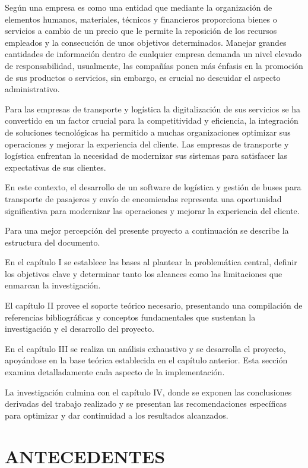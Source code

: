 	Según \textcite{casanueva2000practicas} una empresa es como una entidad que mediante la organización de elementos humanos, materiales, técnicos y financieros proporciona bienes o servicios a cambio de un precio que le permite la reposición de los recursos empleados y la consecución de unos objetivos determinados. Manejar grandes cantidades de información dentro de cualquier empresa demanda un nivel elevado de responsabilidad, usualmente, las compañías ponen más énfasis en la promoción de sus productos o servicios, sin embargo, es crucial no descuidar el aspecto administrativo.
	
	Para las empresas de transporte y logística la digitalización de sus servicios se ha convertido en un factor crucial para la competitividad y eficiencia, la integración de soluciones tecnológicas ha permitido a muchas organizaciones optimizar sus operaciones y mejorar la experiencia del cliente. Las empresas de transporte y logística enfrentan la necesidad de modernizar sus sistemas para satisfacer las expectativas de sus clientes. 
	
	En este contexto, el desarrollo de un software de logística y gestión de buses para transporte de pasajeros y envío de encomiendas representa una oportunidad significativa para modernizar las operaciones y mejorar la experiencia del cliente.
	
	Para una mejor percepción del presente proyecto a continuación se describe la estructura del documento.
	
	En el capítulo I se  establece las bases al plantear la problemática central, definir los objetivos clave y determinar tanto los alcances como las limitaciones que enmarcan la investigación.
	
	El capítulo II provee el soporte teórico necesario, presentando una compilación de referencias bibliográficas y conceptos fundamentales que sustentan la investigación y el desarrollo del proyecto.
	
	En el capítulo III se realiza un análisis exhaustivo y se desarrolla el proyecto, apoyándose en la base teórica establecida en el capítulo anterior. Esta sección examina detalladamente cada aspecto de la implementación.
	
	La investigación culmina con el capítulo IV, donde se exponen las conclusiones derivadas del trabajo realizado y se presentan las recomendaciones específicas para optimizar y dar continuidad a los resultados alcanzados.
	
\section{ANTECEDENTES}

